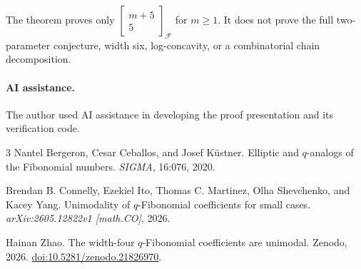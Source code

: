 \documentclass[11pt]{article}
\newcommand{\qfib}[2]{\left[\!\begin{matrix}#1\\#2\end{matrix}\!\right]_{\!\mathcal F}}
\begin{document}
The theorem proves only \(\qfib{m+5}{5}\) for \(m\geq1\).  It does not prove
the full two-parameter conjecture, width six, log-concavity, or a
combinatorial chain decomposition.

\paragraph{AI assistance.}
The author used AI assistance in developing the proof presentation and its
verification code.

\begin{thebibliography}{3}
Nantel Bergeron, Cesar Ceballos, and Josef K\"ustner.
\newblock Elliptic and \(q\)-analogs of the Fibonomial numbers.
\newblock \emph{SIGMA}, 16:076, 2020.

Brendan B. Connelly, Ezekiel Ito, Thomas C. Martinez, Olha Shevchenko, and
Kacey Yang.
\newblock Unimodality of \(q\)-Fibonomial coefficients for small cases.
\newblock \emph{arXiv:2605.12822v1 [math.CO]}, 2026.

Hainan Zhao.
\newblock The width-four \(q\)-Fibonomial coefficients are unimodal.
\newblock Zenodo, 2026. \href{https://doi.org/10.5281/zenodo.21826970}
{doi:10.5281/zenodo.21826970}.
\end{thebibliography}
\end{document}
